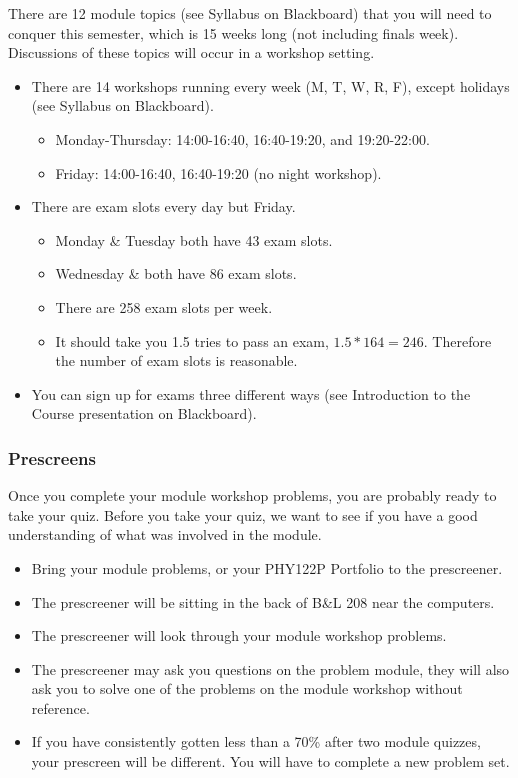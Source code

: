 \documentclass[12pt]{article}
\begin{document}
There are 12 module topics (see Syllabus on Blackboard) that you will need to conquer this semester, which is 15 weeks long (not including finals week). Discussions of these topics will occur in a workshop setting.

\begin{itemize}
	\item There are 14 workshops running every week (M, T, W, R, F), except holidays (see Syllabus on Blackboard).
	\begin{itemize}
		\item Monday-Thursday: 14:00-16:40, 16:40-19:20, and 19:20-22:00.
		\item Friday: 14:00-16:40, 16:40-19:20 (no night workshop).
	\end{itemize}
	\item There are exam slots every day but Friday.
	\begin{itemize}
		\item Monday \& Tuesday both have 43 exam slots.
		\item Wednesday \& both have 86 exam slots. 
		\item There are 258 exam slots per week.
		\item It should take you 1.5 tries to pass an exam, $1.5*164 = 246$. Therefore the number of exam slots is reasonable.
	\end{itemize}
	\item You can sign up for exams three different ways (see Introduction to the Course presentation on Blackboard).
\end{itemize}

\subsubsection{Prescreens} \label{sec:pre}

Once you complete your module workshop problems, you are probably ready to take your quiz. Before you take your quiz, we want to see if you have a good understanding of what was involved in the module.

\begin{itemize}
	\item Bring your module problems, or your PHY122P Portfolio to the prescreener.
	\item The prescreener will be sitting in the back of B\&L 208 near the computers.
	\item The prescreener will look through your module workshop problems.
	\item The prescreener may ask you questions on the problem module, they will also ask you to solve one of the problems on the module workshop without reference.
	\item If you have consistently gotten less than a 70\% after two module quizzes, your prescreen will be different. You will have to complete a new problem set.
\end{itemize}
\end{document}
